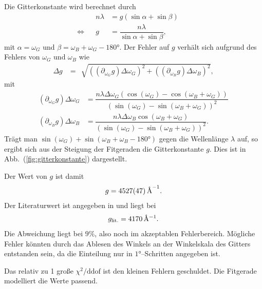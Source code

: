 \documentclass[sn-mathphys-num,iicol]{sn-jnl}
\theoremstyle{thmstyleone}
\theoremstyle{thmstyletwo}
\theoremstyle{thmstylethree}
\begin{document}
Die Gitterkonstante wird berechnet durch
\begin{align} 
        &&n\lambda &=g\left(\sin \alpha +\sin \beta \right)&&\\
        \Leftrightarrow &&g&=\dfrac{n\lambda }{\sin \alpha +\sin \beta },&&
\end{align} 
mit $\alpha =\omega _G$ und $\beta =\omega _B+\omega _G-\ang{180}$.
Der Fehler auf $g$ verhält sich aufgrund des Fehlers von $\omega _G$ und $\omega _B$ wie
\begin{align} 
        \Delta g &= \,\sqrt[]{\left((\partial _{\omega _G}g)\Delta \omega _G\right)^2+\left((\partial _{\omega _B}g)\Delta \omega _B\right)^2}
,\end{align} 
mit
\begin{align} 
        (\partial _{\omega _G}g)\Delta \omega _G &= \dfrac{n\lambda \Delta \omega _G\left(\cos \left(\omega _G\right)-\cos \left(\omega _B+\omega _G\right)\right)}{\left(\sin \left(\omega _G\right)-\sin \left(\omega _B+\omega _G\right)\right)^2}\\
        (\partial _{\omega _B}g)\Delta \omega _B &= \dfrac{n\lambda \Delta \omega _B\cos \left(\omega _B+\omega _G\right)}{\left(\sin \left(\omega _G\right)-\sin \left(\omega _B+\omega _G\right)\right)^2}
.\end{align} 
Trägt man $\sin \left(\omega _G\right)+\sin \left(\omega _B+\omega _B-\ang{180}\right)$ gegen die Wellenlänge $\lambda $ auf, so ergibt sich aus der Steigung der Fitgeraden die Gitterkonstante $g$.
Dies ist in Abb.\ (\ref{fig:gitterkonstante}) dargestellt.

Der Wert von $g$ ist damit
\begin{align} 
        g=\SI{4527+-47}{\text{\r{A}}^{-1}}
.\end{align} 
Der Literaturwert ist angegeben in \cite{LeyboldBalmerserieBeobachtung} und liegt bei
\begin{align} 
        g_\text{lit.}=\SI{4170}{\text{\r{A}^{-1}}}
.\end{align} 
Die Abweichung liegt bei $9\%$, also noch im akzeptablen Fehlerbereich.
Mögliche Fehler könnten durch das Ablesen des Winkels an der Winkelskala des Gitters entstanden sein, da die Einteilung nur in $\ang{1}$--Schritten angegeben ist.

Das relativ zu 1 große $\chi ^2/\text{ddof}$ ist den kleinen Fehlern geschuldet.
Die Fitgerade modelliert die Werte passend.
\end{document}
